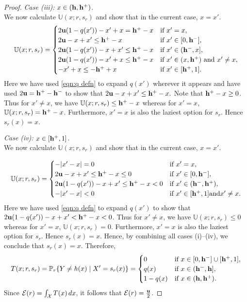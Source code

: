\begin{proof}
\noindent \textit{Case (iii): } $x \in (\mathbf{h}, \mathbf{h^{+}})$.\\
 We now calculate $\mathbb{U}(x;r,s_r)$ and show that in the current case, $x=x'$.
 \begin{equation*}
    \mathbb{U}(x;r,s_r) = \begin{cases}
    2\mathbf{u}(1-q(x')) - x' + x = \mathbf{h^{+}} -x &\text{if } x'= x,\\
    2\mathbf{u} - x + x' \leq \mathbf{h^{+}} - x &\text{if } x' \in [0,\mathbf{h^{-}}],\\
    2\mathbf{u}(1-q(x')) - x + x' \le \mathbf{h^{+}}- x &\text{if } x' \in (\mathbf{h^{-}},x],\\
    2\mathbf{u}(1- q(x')) - x' + x \leq \mathbf{h^{+}} - x    &\text{if } x' \in (x,\mathbf{h^{+}}) \text{ and } x' \neq x,\\
    -x' + x \leq  -\mathbf{h^{+}} + x &\text{if } x' \in [\mathbf{h^{+}},1].        \end{cases}
\end{equation*}
Here we have used \eqref{eqn:q defn} to expand $q(x')$ wherever it appears and have used $2\mathbf{u} = \mathbf{h^{+}} - \mathbf{h^{-}}$ to show that $2\mathbf{u} - x + x' \leq \mathbf{h^{+}} -x. $ Note that $\mathbf{h^{+}} - x \geq 0$. Thus for $x' \neq x$, we have $\mathbb{U}(x;r,s_r) \leq \mathbf{h^{+}}-x$ whereas for $x' = x$, $\mathbb{U}(x;r,s_r) = \mathbf{h^{+}}-x$. Furthermore, $x'=x$ is also the laziest option for $s_r$. Hence $s_r(x) = x$.

\noindent \textit{Case (iv): } $x \in [\mathbf{h^{+}}, 1]$.\\
We now calculate $\mathbb{U}(x;r,s_r)$ and show that in the current case, $x=x'$.

 \begin{equation*}
    \mathbb{U}(x;r,s_r) = \begin{cases}
    -|x'-x| = 0 &\text{if } x'= x,\\
    2\mathbf{u} - x + x' \leq \mathbf{h^{+}} - x \leq 0 &\text{if } x' \in [0,\mathbf{h^{-}}],\\
    2\mathbf{u}(1-q(x')) - x + x' \le  \mathbf{h^{+}}- x < 0 &\text{if } x' \in (\mathbf{h^{-}},\mathbf{h^{+}}),\\
    -|x'-x| <  0 &\text{if } x' \in [\mathbf{h^{+}},1] \text{and} x' \neq x.       \end{cases}
\end{equation*}
Here we have used \eqref{eqn:q defn} to expand $q(x')$ to show that $2\mathbf{u}(1-q(x')) - x + x' < \mathbf{h^{+}}- x < 0$. Thus for $x' \neq x$, we have $\mathbb{U}(x;r,s_r) \leq 0$ whereas for $x' = x$, $\mathbb{U}(x;r,s_r) = 0$. Furthermore, $x'=x$ is also the laziest option for $s_r$. Hence $s_r(x) = x$.
\noindent Hence, by combining all cases (i)--(iv), we conclude that $ s_r(x) = x $. Therefore,
    \[
    T(x; r, s_r) = \mathbb{P}_{r}\{Y \neq h(x) \mid X' = s_r(x)\} = \begin{cases}
        0 & \text{if } x \in [0, \mathbf{h^{-}}] \cup [\mathbf{h^{+}}, 1], \\
        q(x) & \text{if } x \in (\mathbf{h^{-}}, \mathbf{h}], \\
        1 - q(x) & \text{if } x \in (\mathbf{h}, \mathbf{h^{+}}).
    \end{cases}
    \]
    Since $ \mathcal{E}(r) = \int_{\mathcal{X}} T(x) \, dx $, it follows that $ \mathcal{E}(r) = \frac{\mathbf{u}}{2} $.
\end{proof}

